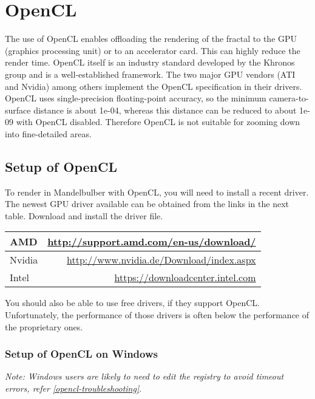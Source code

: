 

\section{OpenCL}\label{opencl}

The use of OpenCL  enables offloading the rendering of the fractal to the
GPU (graphics processing unit) or to an accelerator card. This can highly reduce the render time.
OpenCL itself is an industry standard developed by the Khronos group and
is a well-established framework. The two major GPU vendors (ATI and Nvidia)
among others implement the OpenCL specification in their drivers.
OpenCL uses single-precision floating-point accuracy, so the minimum camera-to-surface distance is about 1e-04, whereas this distance can be reduced to about 1e-09 with OpenCL disabled. Therefore OpenCL is not suitable for zooming down into fine-detailed areas.

\subsection{Setup of OpenCL}\label{setup-opencl}
To render in Mandelbulber with OpenCL, you will need to install a recent driver.
The newest GPU driver available can be obtained from the links in the next table. Download and install the driver file.

\begin{center}
	\begin{tabular}{ | l | r | }
		\hline
		AMD 	&
		\href{http://support.amd.com/en-us/download/}{http://support.amd.com/en-us/download/}
		\\ \hline
		Nvidia 	& 
		\href{http://www.nvidia.de/Download/index.aspx}{http://www.nvidia.de/Download/index.aspx}
		\\ \hline
		Intel	&
		\href{https://downloadcenter.intel.com}{https://downloadcenter.intel.com}
		\\ \hline
	\end{tabular}
\end{center}

You should also be able to use free drivers, if they support OpenCL.
Unfortunately, the performance of those drivers is often below the performance of the proprietary ones.

\subsubsection{Setup of OpenCL on Windows}\label{setup-opencl-windows}
\emph{Note: Windows users are likely to need to edit the registry to avoid timeout errors, refer \ref{opencl-troubleshooting}}.

